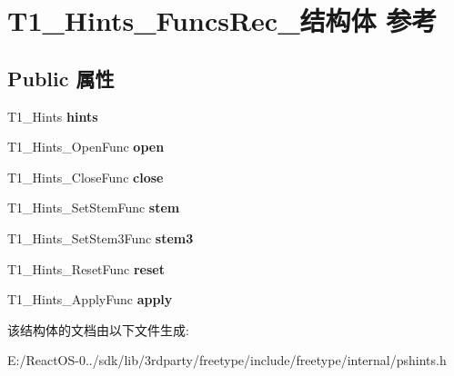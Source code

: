 \hypertarget{struct_t1___hints___funcs_rec__}{}\section{T1\+\_\+\+Hints\+\_\+\+Funcs\+Rec\+\_\+结构体 参考}
\label{struct_t1___hints___funcs_rec__}
\subsection*{Public 属性}
\begin{DoxyCompactItemize}
\item 
\mbox{\label{struct_t1___hints___funcs_rec___a6a58f489e362b746703b4caae91349ef}} 
T1\+\_\+\+Hints {\bfseries hints}
\item 
\mbox{\label{struct_t1___hints___funcs_rec___a41ca09a042c8e92f64822f19486a622a}} 
T1\+\_\+\+Hints\+\_\+\+Open\+Func {\bfseries open}
\item 
\mbox{\label{struct_t1___hints___funcs_rec___aa6d879215bff42f4b3851a9151c78505}} 
T1\+\_\+\+Hints\+\_\+\+Close\+Func {\bfseries close}
\item 
\mbox{\label{struct_t1___hints___funcs_rec___abdbf955a1fc9b19799ed8ea8137c9381}} 
T1\+\_\+\+Hints\+\_\+\+Set\+Stem\+Func {\bfseries stem}
\item 
\mbox{\label{struct_t1___hints___funcs_rec___acc1edae831d279929f93c8eb1872daa3}} 
T1\+\_\+\+Hints\+\_\+\+Set\+Stem3\+Func {\bfseries stem3}
\item 
\mbox{\label{struct_t1___hints___funcs_rec___a5646878cdabd593389e28cffd8b077cb}} 
T1\+\_\+\+Hints\+\_\+\+Reset\+Func {\bfseries reset}
\item 
\mbox{\label{struct_t1___hints___funcs_rec___a3fb5f01de31da9efb2ae8f5251b4d506}} 
T1\+\_\+\+Hints\+\_\+\+Apply\+Func {\bfseries apply}
\end{DoxyCompactItemize}


该结构体的文档由以下文件生成\+:\begin{DoxyCompactItemize}
\item 
E\+:/\+React\+O\+S-\/0../sdk/lib/3rdparty/freetype/include/freetype/internal/pshints.\+h\end{DoxyCompactItemize}
